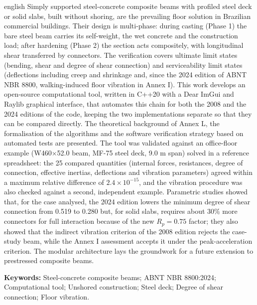 \begin{resumo}[Abstract]
\begin{otherlanguage*}{english}
Simply supported steel-concrete composite beams with profiled steel deck or solid slabs, built without shoring, are the prevailing floor solution in Brazilian commercial buildings. Their design is multi-phase: during casting (Phase 1) the bare steel beam carries its self-weight, the wet concrete and the construction load; after hardening (Phase 2) the section acts compositely, with longitudinal shear transferred by connectors. The verification covers ultimate limit states (bending, shear and degree of shear connection) and serviceability limit states (deflections including creep and shrinkage and, since the 2024 edition of ABNT NBR 8800, walking-induced floor vibration in Annex I). This work develops an open-source computational tool, written in C++20 with a Dear ImGui and Raylib graphical interface, that automates this chain for both the 2008 and the 2024 editions of the code, keeping the two implementations separate so that they can be compared directly. The theoretical background of Annex L, the formalisation of the algorithms and the software verification strategy based on automated tests are presented. The tool was validated against an office-floor example (W460\ensuremath{\times}52.0 beam, MF-75 steel deck, 9.0 m span) solved in a reference spreadsheet: the 25 compared quantities (internal forces, resistances, degree of connection, effective inertias, deflections and vibration parameters) agreed within a maximum relative difference of $2.4 \times 10^{-15}$, and the vibration procedure was also checked against a second, independent example. Parametric studies showed that, for the case analysed, the 2024 edition lowers the minimum degree of shear connection from 0.519 to 0.280 but, for solid slabs, requires about 30\% more connectors for full interaction because of the new $R_p = 0.75$ factor; they also showed that the indirect vibration criterion of the 2008 edition rejects the case-study beam, while the Annex I assessment accepts it under the peak-acceleration criterion. The modular architecture lays the groundwork for a future extension to prestressed composite beams.

\textbf{Keywords:} Steel-concrete composite beams; ABNT NBR 8800:2024; Computational tool; Unshored construction; Steel deck; Degree of shear connection; Floor vibration.
\end{otherlanguage*}
\end{resumo}
